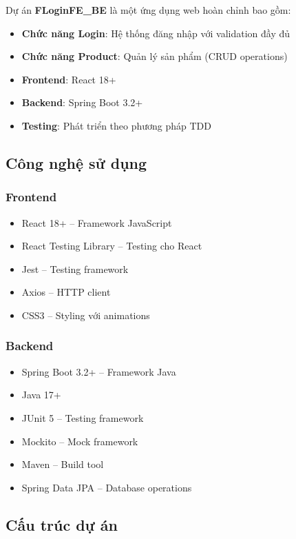\documentclass[a4paper,12pt]{article}
\begin{document}
Dự án \textbf{FLoginFE\_BE} là một ứng dụng web hoàn chỉnh bao gồm:
\begin{itemize}
    \item \textbf{Chức năng Login}: Hệ thống đăng nhập với validation đầy đủ
    \item \textbf{Chức năng Product}: Quản lý sản phẩm (CRUD operations)
    \item \textbf{Frontend}: React 18+
    \item \textbf{Backend}: Spring Boot 3.2+
    \item \textbf{Testing}: Phát triển theo phương pháp TDD
\end{itemize}

\subsection{Công nghệ sử dụng}

\subsubsection{Frontend}
\begin{itemize}
    \item React 18+ -- Framework JavaScript
    \item React Testing Library -- Testing cho React
    \item Jest -- Testing framework
    \item Axios -- HTTP client
    \item CSS3 -- Styling với animations
\end{itemize}

\subsubsection{Backend}
\begin{itemize}
    \item Spring Boot 3.2+ -- Framework Java
    \item Java 17+
    \item JUnit 5 -- Testing framework
    \item Mockito -- Mock framework
    \item Maven -- Build tool
    \item Spring Data JPA -- Database operations
\end{itemize}

\subsection{Cấu trúc dự án}
\end{document}
